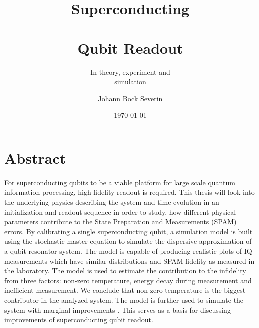 


\title{Superconducting \\ \\Qubit Readout}
\author{Johann Bock Severin}
\subtitle{In theory, experiment and \\simulation}
\date{\today}


% 
{}
\maketitlepage

\chapter*{\centering Abstract}
For superconducting qubits to be a viable platform for large scale quantum information processing, high-fidelity readout is required. This thesis will look into the underlying physics describing the system and time evolution in an initialization and readout sequence in order to study, how different physical parameters contribute to the State Preparation and Measurements (SPAM) errors. By calibrating a single superconducting qubit, a simulation model is built using the stochastic master equation to simulate the dispersive approximation of a qubit-resonator system. The model is capable of producing realistic plots of IQ measurements which have similar distributions and SPAM fidelity as measured in the laboratory. The model is used to estimate the contribution to the infidelity from three factors: non-zero temperature, energy decay during measurement and inefficient measurement. We conclude that non-zero temperature is the biggest contributor in the analyzed system. The model is further used to simulate the system with marginal improvements . This serves as a basis for discussing improvements of superconducting qubit readout.






